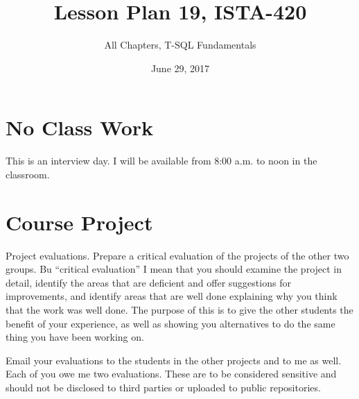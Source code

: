 \documentclass{article}
\title{Lesson Plan 19, ISTA-420}
\author{All Chapters, T-SQL Fundamentals}
\date{June 29, 2017}
\begin{document}
    

    \maketitle{}


    \section{No Class Work}

    This is an interview day. I will be available from 8:00 a.m. to noon in the classroom.

    \section{Course Project}

    Project evaluations. Prepare a critical evaluation of the projects of the other two groups. Bu ``critical evaluation'' I mean that you should examine the project in detail, identify the areas that are deficient and offer suggestions for improvements, and identify areas that are well done explaining why you think that the work was well done. The purpose of this is to give the other students the benefit of your experience, as well as showing you alternatives to do the same thing you have been working on.

    Email your evaluations to the students in the other projects and to me as well. Each of you owe me two evaluations. These are to be considered sensitive and should not be disclosed to third parties or uploaded to public repositories.
\end{document}
